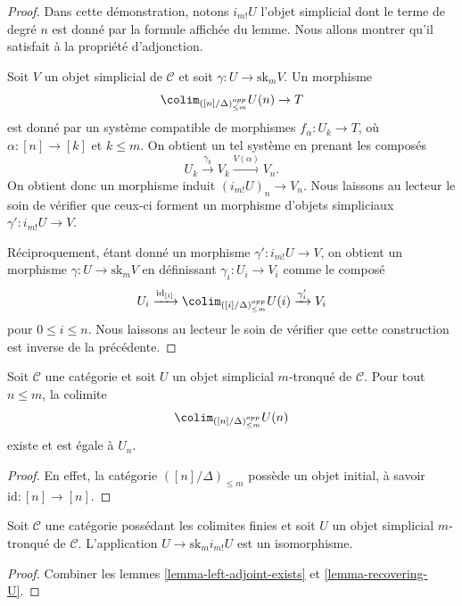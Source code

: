 \begin{proof}
Dans cette démonstration, notons $i_{m!}U$ l'objet simplicial dont le
terme de degré $n$ est donné par la formule affichée du lemme. Nous allons
montrer qu'il satisfait à la propriété d'adjonction.

\medskip\noindent
Soit $V$ un objet simplicial de $\mathcal{C}$ et soit
$\gamma : U \to \text{sk}_mV$. Un morphisme
$$
\colim_{([n]/\Delta)_{\leq m}^{opp}} U(n) \to T
$$
est donné par un système compatible de morphismes
$f_\alpha : U_k \to T$, où $\alpha : [n] \to [k]$ et $k \leq m$.
On obtient un tel système en prenant les composés
$$
U_k \xrightarrow{\gamma_k} V_k \xrightarrow{V(\alpha)} V_n.
$$
On obtient donc un morphisme induit $(i_{m!}U)_n \to V_n$.
Nous laissons au lecteur le soin de vérifier que ceux-ci forment un
morphisme d'objets simpliciaux $\gamma' : i_{m!}U \to V$.

\medskip\noindent
Réciproquement, étant donné un morphisme $\gamma' : i_{m!}U \to V$,
on obtient un morphisme $\gamma : U \to \text{sk}_m V$ en définissant
$\gamma_i : U_i \to V_i$ comme le composé
$$
U_i
\xrightarrow{\text{id}_{[i]}}
\colim_{([i]/\Delta)_{\leq m}^{opp}} U(i)
\xrightarrow{\gamma'_i}
V_i
$$
pour $0 \leq i \leq n$. Nous laissons au lecteur le soin de vérifier que
cette construction est inverse de la précédente.
\end{proof}

\begin{lemma}
\label{lemma-recovering-U}
Soit $\mathcal{C}$ une catégorie et soit $U$ un objet simplicial
$m$-tronqué de $\mathcal{C}$. Pour tout $n \leq m$, la colimite
$$
\colim_{([n]/\Delta)_{\leq m}^{opp}} U(n)
$$
existe et est égale à $U_n$.
\end{lemma}

\begin{proof}
En effet, la catégorie $([n]/\Delta)_{\leq m}$ possède un objet initial,
à savoir $\text{id} : [n] \to [n]$.
\end{proof}

\begin{lemma}
\label{lemma-recovering-U-for-real}
Soit $\mathcal{C}$ une catégorie possédant les colimites finies et soit
$U$ un objet simplicial $m$-tronqué de $\mathcal{C}$. L'application
$U \to \text{sk}_m i_{m!}U$ est un isomorphisme.
\end{lemma}

\begin{proof}
Combiner les lemmes \ref{lemma-left-adjoint-exists} et
\ref{lemma-recovering-U}.
\end{proof}

